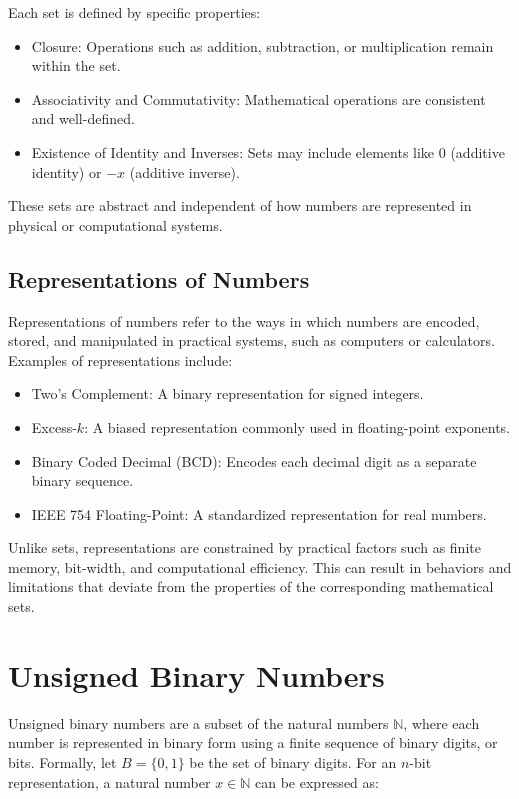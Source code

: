 Each set is defined by specific properties:
\begin{itemize}
    \item Closure: Operations such as addition, subtraction, or multiplication remain within the set.
    \item Associativity and Commutativity: Mathematical operations are consistent and well-defined.
    \item Existence of Identity and Inverses: Sets may include elements like \( 0 \) (additive identity) or \( -x \) (additive inverse).
\end{itemize}

These sets are abstract and independent of how numbers are represented in physical or computational systems.

\subsection{Representations of Numbers}
Representations of numbers refer to the ways in which numbers are encoded, stored, and manipulated in practical systems, such as computers or calculators. Examples of representations include:

\begin{itemize}
    \item Two's Complement: A binary representation for signed integers.
    \item Excess-\( k \): A biased representation commonly used in floating-point exponents.
    \item Binary Coded Decimal (BCD): Encodes each decimal digit as a separate binary sequence.
    \item IEEE 754 Floating-Point: A standardized representation for real numbers.
\end{itemize}

Unlike sets, representations are constrained by practical factors such as finite memory, bit-width, and computational efficiency. This can result in behaviors and limitations that deviate from the properties of the corresponding mathematical sets.


\section{Unsigned Binary Numbers}
Unsigned binary numbers are a subset of the natural numbers \( \mathbb{N} \), where each number is represented in binary form using a finite sequence of binary digits, or bits. Formally, let \( B = \{0, 1\} \) be the set of binary digits. For an \( n \)-bit representation, a natural number \( x \in \mathbb{N} \) can be expressed as:

